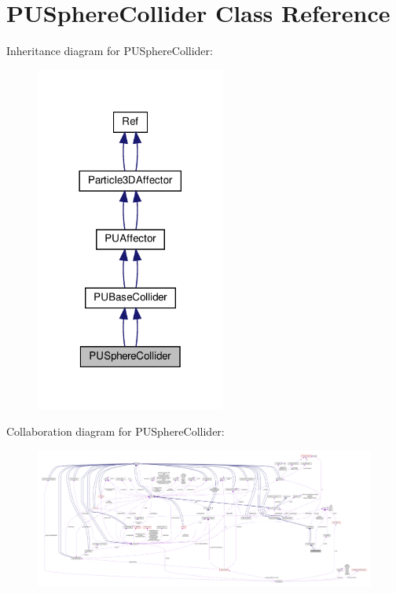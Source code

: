 \hypertarget{classPUSphereCollider}{}\section{P\+U\+Sphere\+Collider Class Reference}
\label{classPUSphereCollider}


Inheritance diagram for P\+U\+Sphere\+Collider\+:
\nopagebreak
\begin{figure}[H]
\begin{center}
\leavevmode
\includegraphics[width=177pt]{classPUSphereCollider__inherit__graph}
\end{center}
\end{figure}


Collaboration diagram for P\+U\+Sphere\+Collider\+:
\nopagebreak
\begin{figure}[H]
\begin{center}
\leavevmode
\includegraphics[width=350pt]{classPUSphereCollider__coll__graph}
\end{center}
\end{figure}
